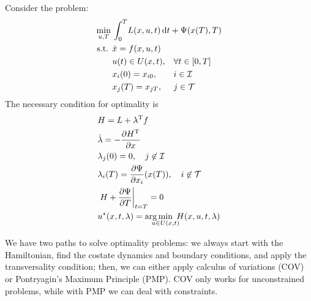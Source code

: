 \begin{oframed}
\begin{thm}
  Consider the problem:
  \begin{align}
    \min_{u,T} {} & \int_0^T\! L(x,u,t)\mathop{}\!\mathrm{d} t + \Psi(x(T),T) \\
    \text{s.t. } & \begin{aligned}[t]
      & \dot x = f(x,u,t) \\
      & u(t)\in U(x,t), && \forall t\in[0,T] \\
      & x_i(0) = x_{i0}, && i\in\mathcal I \\
      & x_j(T) = x_{jT}, && j\in\mathcal T
    \end{aligned} 
  \end{align}
  The necessary condition for optimality is
  \begin{align}
    & H = L + \lambda\trans f \\
    & \dot\lambda = -\pder{H\trans}{x} \\
    & \lambda_j(0) = 0, \quad j\not\in\mathcal I \\
    & \lambda_i(T) = \pder{\Psi}{x_i}(x(T)), \quad i\not\in\mathcal T \\
    & \left. H + \pder{\Psi}{T} \right|_{t=T} = 0 \\
    & u^*(x,t,\lambda) = \arg\min_{\mathclap{u\in U(x,t)}} \; H(x,u,t,\lambda)
  \end{align}
\end{thm}
\end{oframed}

We have two paths to solve optimality problems: we always start with the Hamiltonian, find the costate dynamics and boundary conditions, and apply the transversality condition; then, we can either apply calculus of variations (COV) or Pontryagin's Maximum Principle (PMP). COV only works for unconstrained problems, while with PMP we can deal with constraints.

